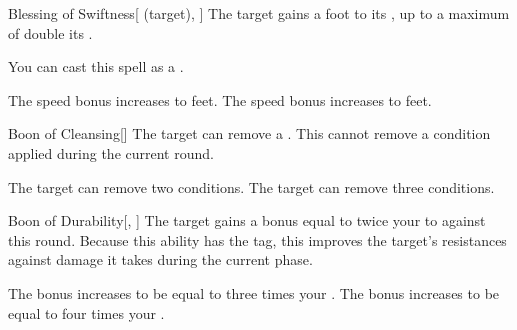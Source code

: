 \lowercase{\hypertarget{spell:Blessing of Swiftness}{}}\label{spell:Blessing of Swiftness}
\begin{attuneability}[Rank 3]{\hypertarget{spell:Blessing of Swiftness}{Blessing of Swiftness}}[ (target), ]
The target gains a  foot  to its , up to a maximum of double its .

You can cast this spell as a .

\rankline
{} The speed bonus increases to  feet.
 The speed bonus increases to  feet.

\end{attuneability}
\vspace{0.25em}



\lowercase{\hypertarget{spell:Boon of Cleansing}{}}\label{spell:Boon of Cleansing}
\begin{freeability}[Rank 3]{\hypertarget{spell:Boon of Cleansing}{Boon of Cleansing}}[]
The target can remove a .
This cannot remove a condition applied during the current round.

\rankline
{} The target can remove two conditions.
 The target can remove three conditions.

\end{freeability}
\vspace{0.25em}



\lowercase{\hypertarget{spell:Boon of Durability}{}}\label{spell:Boon of Durability}
\begin{freeability}[Rank 3]{\hypertarget{spell:Boon of Durability}{Boon of Durability}}[, ]
The target gains a bonus equal to twice your  to  against  this round.
Because this ability has the  tag, this improves the target's resistances against damage it takes during the current phase.

\rankline
{} The bonus increases to be equal to three times your .
 The bonus increases to be equal to four times your .

\end{freeability}
\vspace{0.25em}



